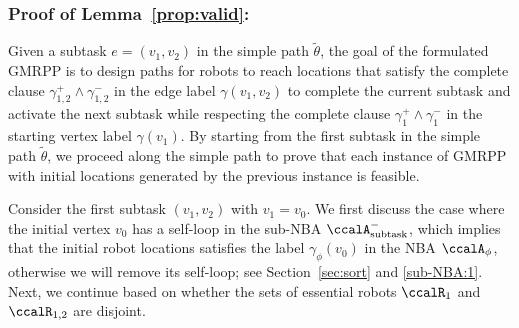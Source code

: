 \documentclass[Afour,sageh,times]{sagej}
\newcounter{mycounter}
\newcommand{\auto}[1]{\ccalA_{\textup{#1}}}
\newcommand{\autop}{\ccalA_{\phi}}
\begin{document}
{{%




\subsubsection{Proof of Lemma~\ref{prop:valid}:}\label{app:valid}
Given a subtask $e = (v_1, v_2)$ in the simple path $\tilde{\theta}$, the goal of the formulated  GMRPP is to design paths for robots to reach locations that satisfy the complete clause $\gamma_{1,2}^+ \wedge \gamma_{1,2}^-$ in the edge label $\gamma(v_1, v_2)$ to complete the current subtask and activate the next subtask while respecting the complete clause $\gamma_1^+ \wedge \gamma_1^-$ in the starting vertex label $\gamma(v_1)$. By starting from the first subtask in the simple path $\tilde{\theta}$, we proceed along the simple path to prove that each instance of GMRPP with initial locations generated by the previous instance is feasible.


Consider the first subtask $(v_1, v_2)$ with $v_1 = v_0$. We first discuss the case where  the initial vertex $v_0$ has a self-loop in the sub-NBA $\auto{subtask}^-$, which implies that the initial robot locations satisfies the label $\gamma_{\phi}(v_0)$ in the NBA $\autop$, otherwise we will remove its self-loop; see Section~\ref{sec:sort} and \ref{sub-NBA:1}. Next, we continue based on whether the sets of essential robots $\ccalR_1$ and $\ccalR_{1,2}$ are disjoint.
}}
\end{document}
